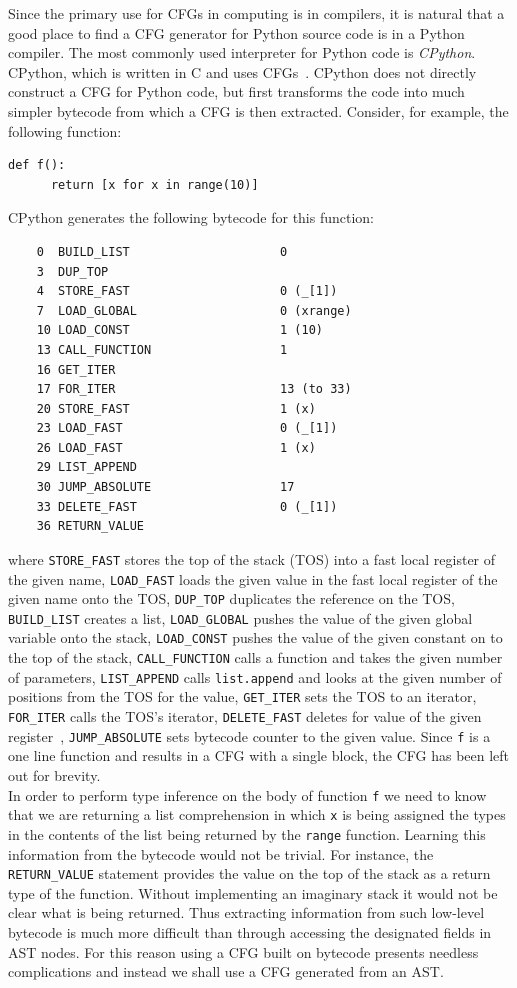 \documentclass[12pt, titlepage]{article}
\begin{document}
Since the primary use for CFGs in computing is in compilers, it is natural that a good place to find a CFG generator for Python source code is in a Python compiler. The most commonly used interpreter for Python code is \textit{CPython}. CPython, which is written in C and uses CFGs~\cite{cpythonCFG}. CPython does not directly construct a CFG for Python code, but first transforms the code into much simpler bytecode from which a CFG is then extracted. Consider, for example, the following function:
\begin{lstlisting}[mathescape]
    def f():
      return [x for x in range(10)]
\end{lstlisting} 
CPython generates the following bytecode for this function:~\cite{cpythonBytecode}
\begin{verbatim}
    0  BUILD_LIST                     0
    3  DUP_TOP
    4  STORE_FAST                     0 (_[1])
    7  LOAD_GLOBAL                    0 (xrange)
    10 LOAD_CONST                     1 (10)
    13 CALL_FUNCTION                  1
    16 GET_ITER
    17 FOR_ITER                       13 (to 33)
    20 STORE_FAST                     1 (x)
    23 LOAD_FAST                      0 (_[1])
    26 LOAD_FAST                      1 (x)
    29 LIST_APPEND
    30 JUMP_ABSOLUTE                  17
    33 DELETE_FAST                    0 (_[1])
    36 RETURN_VALUE
\end{verbatim}
where \texttt{STORE\_FAST} stores the top of the stack (TOS) into a fast local register of the given name, \texttt{LOAD\_FAST} loads the given value in the fast local register of the given name onto the TOS, \texttt{DUP\_TOP} duplicates the reference on the TOS, \texttt{BUILD\_LIST} creates a list, \texttt{LOAD\_GLOBAL} pushes the value of the given global variable onto the stack, \texttt{LOAD\_CONST} pushes the value of the given constant on to the top of the stack, \texttt{CALL\_FUNCTION} calls a function and takes the given number of parameters, \texttt{LIST\_APPEND} calls \texttt{list.append} and looks at the given number of positions from the TOS for the value, \texttt{GET\_ITER} sets the TOS to an iterator, \texttt{FOR\_ITER} calls the TOS's iterator, \texttt{DELETE\_FAST} deletes for value of the given register~\cite{disBytecode}, \texttt{JUMP\_ABSOLUTE} sets bytecode counter to the given value. Since \texttt{f} is a one line function and results in a CFG with a single block, the CFG has been left out for brevity. \\
\indent In order to perform type inference on the body of function \texttt{f} we need to know that we are returning a list comprehension in which \texttt{x} is being assigned the types in the contents of the list being returned by the \texttt{range} function. Learning this information from the bytecode would not be trivial. For instance, the \texttt{RETURN\_VALUE} statement provides the value on the top of the stack as a return type of the function. Without implementing an imaginary stack it would not be clear what is being returned. Thus extracting information from such low-level bytecode is much more difficult than through accessing the designated fields in AST nodes. For this reason using a CFG built on bytecode presents needless complications and instead we shall use a CFG generated from an AST. \\
\end{document}
